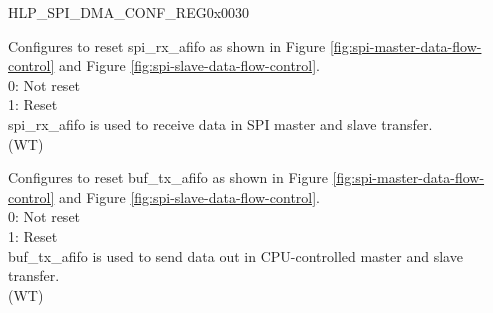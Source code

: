 \begin{register}{H}{LP\_SPI\_DMA\_CONF\_REG}{0x0030}\label{regdesc:LPSPIDMACONFREG}
%
%
%
%
\regnewline%
\begin{regdesc}\begin{reglist}
\label{fielddesc:LPSPIRXAFIFORST}\item [LP\_SPI\_RX\_AFIFO\_RST] Configures to reset spi\_rx\_afifo as shown in Figure \ref{fig:spi-master-data-flow-control} and Figure \ref{fig:spi-slave-data-flow-control}.\\
0: Not reset \\
1: Reset \\
spi\_rx\_afifo is used to  receive data in SPI master and slave transfer. \\(WT)
\label{fielddesc:LPSPIBUFAFIFORST}\item [LP\_SPI\_BUF\_AFIFO\_RST] Configures to reset buf\_tx\_afifo as shown in Figure \ref{fig:spi-master-data-flow-control} and Figure \ref{fig:spi-slave-data-flow-control}.\\
0: Not reset \\
1: Reset \\
buf\_tx\_afifo is used to send data out in CPU-controlled master and slave transfer. \\(WT)

\end{reglist}\end{regdesc}
\end{register}


